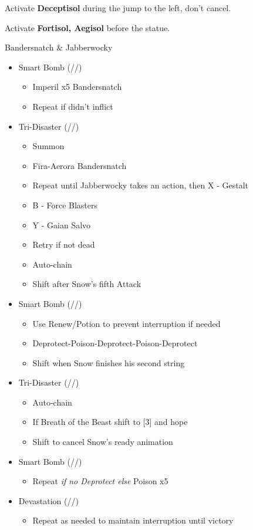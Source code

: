 Activate \textbf{Deceptisol} during the jump to the left, don't cancel.

Activate \textbf{Fortisol, Aegisol} before the statue.

\renewcommand{\second}{[2] Devastation (\sab/\com/\com)}
\renewcommand{\fifth}{[5] Smart Bomb (\sab/\rav/\rav)}
\renewcommand{\sixth}{[6] Tri-Disaster (\rav/\rav/\rav)}
\begin{battle}{Bandersnatch \& Jabberwocky}
\begin{itemize}
    \item \fifth
    \begin{itemize}
        \item Imperil x5 Bandersnatch
        \item Repeat if didn't inflict
    \end{itemize}
    \item \sixth
    \begin{itemize}
        \item Summon
        \item Fira-Aerora Bandersnatch
        \item Repeat until Jabberwocky takes an action, then X - Gestalt
        \item B - Force Blasters
        \item Y - Gaian Salvo
        \item Retry if not dead
        \item Auto-chain
        \item Shift after Snow's fifth Attack
    \end{itemize}
    \item \fifth
    \begin{itemize}
        \item Use Renew/Potion to prevent interruption if needed
        \item Deprotect-Poison-Deprotect-Poison-Deprotect
        \item Shift when Snow finishes his second string
    \end{itemize}
    \item \sixth
    \begin{itemize}
        \item Auto-chain
        \item If Breath of the Beast shift to [3] and hope
        \item Shift to cancel Snow's ready animation
    \end{itemize}
    \item \fifth
    \begin{itemize}
        \item Repeat \textit{if no Deprotect else } Poison x5
    \end{itemize}
    \item \second
    \begin{itemize}
        \item Repeat as needed to maintain interruption until victory
    \end{itemize}
\end{itemize}
\end{battle}

